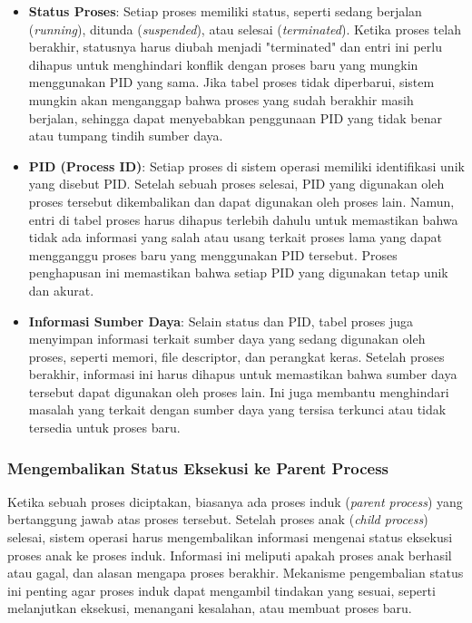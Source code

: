 \documentclass[12pt]{article}
\begin{document}
\begin{itemize}
    \item \textbf{Status Proses}: Setiap proses memiliki status, seperti sedang berjalan (\textit{running}), ditunda (\textit{suspended}), atau selesai (\textit{terminated}). Ketika proses telah berakhir, statusnya harus diubah menjadi "terminated" dan entri ini perlu dihapus untuk menghindari konflik dengan proses baru yang mungkin menggunakan PID yang sama. Jika tabel proses tidak diperbarui, sistem mungkin akan menganggap bahwa proses yang sudah berakhir masih berjalan, sehingga dapat menyebabkan penggunaan PID yang tidak benar atau tumpang tindih sumber daya.
    
    \item \textbf{PID (Process ID)}: Setiap proses di sistem operasi memiliki identifikasi unik yang disebut PID. Setelah sebuah proses selesai, PID yang digunakan oleh proses tersebut dikembalikan dan dapat digunakan oleh proses lain. Namun, entri di tabel proses harus dihapus terlebih dahulu untuk memastikan bahwa tidak ada informasi yang salah atau usang terkait proses lama yang dapat mengganggu proses baru yang menggunakan PID tersebut. Proses penghapusan ini memastikan bahwa setiap PID yang digunakan tetap unik dan akurat.
    
    \item \textbf{Informasi Sumber Daya}: Selain status dan PID, tabel proses juga menyimpan informasi terkait sumber daya yang sedang digunakan oleh proses, seperti memori, file descriptor, dan perangkat keras. Setelah proses berakhir, informasi ini harus dihapus untuk memastikan bahwa sumber daya tersebut dapat digunakan oleh proses lain. Ini juga membantu menghindari masalah yang terkait dengan sumber daya yang tersisa terkunci atau tidak tersedia untuk proses baru.
\end{itemize}

\subsubsection{Mengembalikan Status Eksekusi ke Parent Process}
Ketika sebuah proses diciptakan, biasanya ada proses induk (\textit{parent process}) yang bertanggung jawab atas proses tersebut. Setelah proses anak (\textit{child process}) selesai, sistem operasi harus mengembalikan informasi mengenai status eksekusi proses anak ke proses induk. Informasi ini meliputi apakah proses anak berhasil atau gagal, dan alasan mengapa proses berakhir. Mekanisme pengembalian status ini penting agar proses induk dapat mengambil tindakan yang sesuai, seperti melanjutkan eksekusi, menangani kesalahan, atau membuat proses baru.
\end{document}
